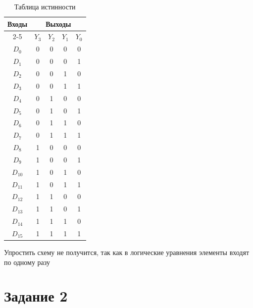 \documentclass[a4paper,12pt]{article}
\begin{document}
\begin{table}[H]
  \centering
  \begin{tabular}{|c|cccc|}
    \hline
    \multirow{2}{*}{\textbf{Входы}} &
    \multicolumn{4}{c|}{\textbf{Выходы}} \\ \cline{2-5}
    & $Y_3$ & $Y_2$ & $Y_1$ & $Y_0$ \\ \hline
    $D_{0}$ & 0 & 0 & 0 & 0 \\
    $D_{1}$ & 0 & 0 & 0 & 1 \\
    $D_{2}$ & 0 & 0 & 1 & 0 \\
    $D_{3}$ & 0 & 0 & 1 & 1 \\
    $D_{4}$ & 0 & 1 & 0 & 0 \\
    $D_{5}$ & 0 & 1 & 0 & 1 \\
    $D_{6}$ & 0 & 1 & 1 & 0 \\
    $D_{7}$ & 0 & 1 & 1 & 1 \\
    $D_{8}$ & 1 & 0 & 0 & 0 \\
    $D_{9}$ & 1 & 0 & 0 & 1 \\
    $D_{10}$ & 1 & 0 & 1 & 0 \\
    $D_{11}$ & 1 & 0 & 1 & 1 \\
    $D_{12}$ & 1 & 1 & 0 & 0 \\
    $D_{13}$ & 1 & 1 & 0 & 1 \\
    $D_{14}$ & 1 & 1 & 1 & 0 \\
    $D_{15}$ & 1 & 1 & 1 & 1 \\
    \hline
  \end{tabular}
  \caption{Таблица истинности}
\end{table}

Упростить схему не получится, так как в логические уравнения
элементы входят по одному разу

\section*{Задание 2}
\end{document}
